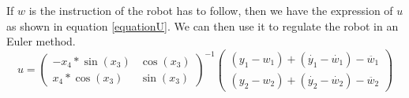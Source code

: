 If $w$ is the instruction of the robot has to follow, then we have the expression of $u$ as shown in equation \ref{equationU}. We can then use it to regulate the robot in an Euler method.
\begin{equation}
 u =
\begin{pmatrix}
	-x_4*\sin(x_3) & \cos(x_3)\\
	 x_4*\cos(x_3) & \sin(x_3)
\end{pmatrix}^{-1}
\begin{pmatrix}
	(y_1-w_1) + (\dot{y_1} - \dot{w_1}) -  \ddot{w_1}\\
	(y_2-w_2) + (\dot{y_2} - \dot{w_2}) -  \ddot{w_2}
\end{pmatrix}
\label{equationU}
\end{equation}
